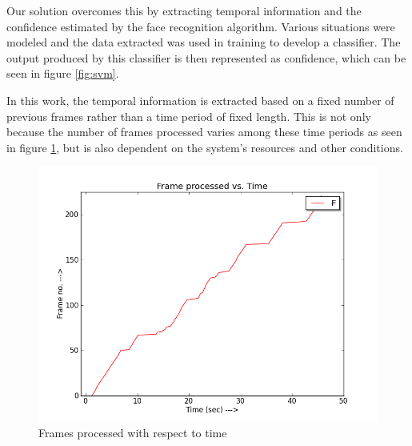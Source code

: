 \documentclass[%
        final,
        notitlepage,
        narroweqnarray,
        inline,
        ]{ieee}
\begin{document}
Our solution overcomes this by extracting temporal information and the confidence estimated by the face recognition algorithm.
Various situations were modeled and the data extracted was used in training to develop a classifier.
The output produced by this classifier is then represented as confidence, which can be seen in figure \ref{fig:svm}.

In this work, the temporal information is extracted based on a fixed number of previous frames rather than a time period of fixed length.
This is not only because the number of frames processed varies among these time periods as seen in figure \ref{fig:ftime}, but is also dependent on the system's resources and other conditions.

\begin{figure}[h!]
	\centering
	\includegraphics[scale=0.40]{img/t_fno.png}
	\caption{Frames processed with respect to time}
	\label{fig:ftime}
\end{figure}
\end{document}
